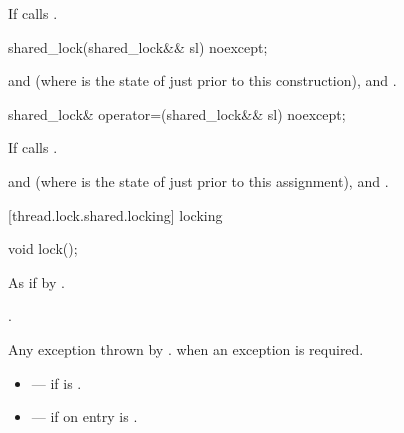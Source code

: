 \begin{itemdescr}
\pnum
\effects If  calls .
\end{itemdescr}

%
\begin{itemdecl}
shared_lock(shared_lock&& sl) noexcept;
\end{itemdecl}

\begin{itemdescr}
\pnum
\postconditions {} and  (where
 is the state of  just prior to this construction),
 and .
\end{itemdescr}

%
\begin{itemdecl}
shared_lock& operator=(shared_lock&& sl) noexcept;
\end{itemdecl}

\begin{itemdescr}
\pnum
\effects If  calls .

\pnum
\postconditions {} and  (where
 is the state of  just prior to this assignment),
 and .
\end{itemdescr}

[thread.lock.shared.locking]{ locking}

%
\begin{itemdecl}
void lock();
\end{itemdecl}

\begin{itemdescr}
\pnum
\effects As if by .

\pnum
\postconditions {}.

\pnum
\throws Any exception thrown by .
 when an exception is required.

\pnum
\errors
\begin{itemize}
\item {} --- if  is .
\item {} --- if on entry  is
.
\end{itemize}
\end{itemdescr}


